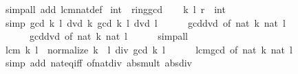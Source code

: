 \begin{isabellebody}
\isamarkupfalse%
\ {\isacharparenleft}{\kern0pt}simp{\isacharunderscore}{\kern0pt}all\ add{\isacharcolon}{\kern0pt}\ lcm{\isacharunderscore}{\kern0pt}nat{\isacharunderscore}{\kern0pt}def{\isacharparenright}{\kern0pt}%
\endisatagproof
{\isafoldproof}%
%
\isadelimproof
\isanewline
%
\endisadelimproof
\isanewline
{}\isamarkupfalse%
\ int\ {\isacharcolon}{\kern0pt}{\isacharcolon}{\kern0pt}\ ring{\isacharunderscore}{\kern0pt}gcd\isanewline
%
\isadelimproof
%
\endisadelimproof
%
\isatagproof
{}\isamarkupfalse%
\isanewline
\ \ \isamarkupfalse%
\ k\ l\ r\ {\isacharcolon}{\kern0pt}{\isacharcolon}{\kern0pt}\ int\isanewline
\ \ \isamarkupfalse%
\ {\isacharbrackleft}{\kern0pt}simp{\isacharbrackright}{\kern0pt}{\isacharcolon}{\kern0pt}\ {\isachardoublequoteopen}gcd\ k\ l\ dvd\ k{\isachardoublequoteclose}\ {\isachardoublequoteopen}gcd\ k\ l\ dvd\ l{\isachardoublequoteclose}\isanewline
\ \ \ \ \isamarkupfalse%
\ gcd{\isacharunderscore}{\kern0pt}dvd{}\ {\isacharbrackleft}{\kern0pt}of\ {\isachardoublequoteopen}nat\ {\isasymbar}k{\isasymbar}{\isachardoublequoteclose}\ {\isachardoublequoteopen}nat\ {\isasymbar}l{\isasymbar}{\isachardoublequoteclose}{\isacharbrackright}{\kern0pt}\isanewline
\ \ \ \ \ \ gcd{\isacharunderscore}{\kern0pt}dvd{}\ {\isacharbrackleft}{\kern0pt}of\ {\isachardoublequoteopen}nat\ {\isasymbar}k{\isasymbar}{\isachardoublequoteclose}\ {\isachardoublequoteopen}nat\ {\isasymbar}l{\isasymbar}{\isachardoublequoteclose}{\isacharbrackright}{\kern0pt}\isanewline
\ \ \ \ \isamarkupfalse%
\ simp{\isacharunderscore}{\kern0pt}all\isanewline
\ \ \isamarkupfalse%
\ {\isachardoublequoteopen}lcm\ k\ l\ {\isacharequal}{\kern0pt}\ normalize\ {\isacharparenleft}{\kern0pt}k\ {\isacharasterisk}{\kern0pt}\ l\ div\ gcd\ k\ l{\isacharparenright}{\kern0pt}{\isachardoublequoteclose}\isanewline
\ \ \ \ \isamarkupfalse%
\ lcm{\isacharunderscore}{\kern0pt}gcd\ {\isacharbrackleft}{\kern0pt}of\ {\isachardoublequoteopen}nat\ {\isasymbar}k{\isasymbar}{\isachardoublequoteclose}\ {\isachardoublequoteopen}nat\ {\isasymbar}l{\isasymbar}{\isachardoublequoteclose}{\isacharbrackright}{\kern0pt}\isanewline
\ \ \ \ \isamarkupfalse%
\ {\isacharparenleft}{\kern0pt}simp\ add{\isacharcolon}{\kern0pt}\ nat{\isacharunderscore}{\kern0pt}eq{\isacharunderscore}{\kern0pt}iff\ of{\isacharunderscore}{\kern0pt}nat{\isacharunderscore}{\kern0pt}div\ abs{\isacharunderscore}{\kern0pt}mult\ abs{\isacharunderscore}{\kern0pt}div{\isacharparenright}{\kern0pt}\isanewline

\end{isabellebody}
